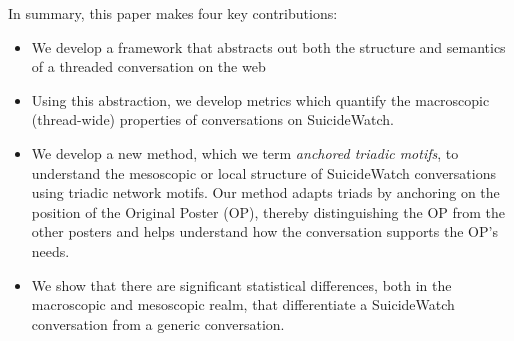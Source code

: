 In summary, this paper makes four key contributions: 
\begin{itemize} 
    \item We develop a framework  that abstracts out both the structure and semantics of a threaded conversation on the web
    \item Using this abstraction, we develop metrics which quantify the macroscopic (thread-wide) properties of conversations on SuicideWatch. 
    \item We develop a new method, which we term \textit{anchored triadic motifs}, to understand the mesoscopic or local structure of SuicideWatch conversations using triadic network motifs. Our method adapts triads by anchoring on the position of the Original Poster (OP), thereby distinguishing the OP from the other posters and helps understand how the conversation supports the OP's needs. 
    \item We show that there are significant statistical differences, both in the macroscopic and mesoscopic realm, that differentiate a SuicideWatch conversation from a generic conversation. 
\end{itemize}


